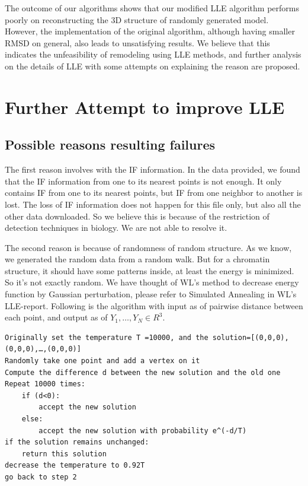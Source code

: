 \documentclass[12pt]{article} %
\begin{document}
The outcome of our algorithms shows that our modified LLE algorithm performs poorly on reconstructing the 3D structure of randomly generated model. However, the implementation of the original algorithm, although having smaller RMSD on general, also leads to unsatisfying results. We believe that this indicates the unfeasibility of remodeling using LLE methods, and further analysis on the details of LLE with some attempts on explaining the reason are proposed.


\section{Further Attempt to improve LLE}


\subsection{Possible reasons resulting failures}

The first reason involves with the IF information. In the data provided, we found that the IF information from one to its nearest points is not enough. It only contains IF from one to its nearest points, but IF from one neighbor to another is lost. The loss of IF information does not happen for this file only, but also all the other data downloaded. So we believe this is because of the restriction of detection techniques in biology. We are not able to resolve it.

The second reason is because of randomness of random structure. As we know, we generated the random data from a random walk. But for a chromatin structure, it should have some patterns inside, at least the energy is minimized. So it's not exactly random. We have thought of WL's method to decrease energy function by Gaussian perturbation, please refer to Simulated Annealing in WL's LLE-report. Following is the algorithm with input as of pairwise distance between each point, and output as of $Y_1,…,Y_N \in R^3$.

\begin{lstlisting}
Originally set the temperature T =10000, and the solution=[(0,0,0),(0,0,0),…,(0,0,0)]
Randomly take one point and add a vertex on it
Compute the difference d between the new solution and the old one
Repeat 10000 times:
	if (d<0):
		accept the new solution
	else:
		accept the new solution with probability e^(-d/T)
if the solution remains unchanged:
	return this solution
decrease the temperature to 0.92T
go back to step 2
\end{lstlisting}
\end{document}
